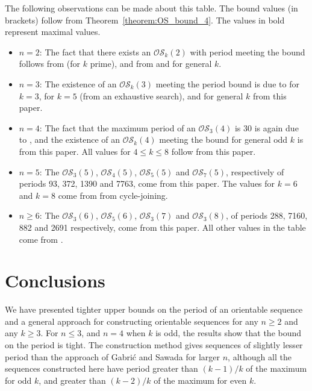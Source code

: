 \documentclass[a4paper,11pt]{article}
\begin{document}
The following observations can be made about this table.  The bound values (in brackets) follow
from Theorem~\ref{theorem:OS_bound_4}. The values in bold represent maximal values.
\begin{itemize}
\item $n=2$:  The fact that there exists an $\mathcal{OS}_k(2)$ with period meeting the bound
    follows from \cite[Theorem 5.4]{Alhakim24a} (for $k$ prime), and from \cite[Theorem
    2]{Gabric25} and \cite[Lemma 2.2]{Mitchell25a} for general $k$.
\item $n=3$: The existence of an $\mathcal{OS}_k(3)$ meeting the period bound is due to
    \cite[Example 5.1]{Alhakim24a} for $k=3$, \cite[Section 1]{Gabric25} for $k=5$ (from an
    exhaustive search), and for general $k$ from this paper.
\item $n=4$: The fact that the maximum period of an $\mathcal{OS}_3(4)$ is 30 is again due to
    \cite[Section 1]{Gabric25}, and the existence of an $\mathcal{OS}_k(4)$ meeting the bound
    for general odd $k$ is from this paper. All values for $4\leq k\leq 8$ follow from this
    paper.
\item $n=5$: The $\mathcal{OS}_3(5)$, $\mathcal{OS}_4(5)$, $\mathcal{OS}_5(5)$ and
    $\mathcal{OS}_7(5)$, respectively of periods 93, 372, 1390 and 7763, come from this paper.
    The values for $k=6$ and $k=8$ come from \cite[Theorem 11]{Gabric25} from cycle-joining.
\item $n\geq6$: The $\mathcal{OS}_3(6)$, $\mathcal{OS}_5(6)$, $\mathcal{OS}_3(7)$ and
    $\mathcal{OS}_3(8)$, of periods 288, 7160, 882 and 2691 respectively, come from this paper.
    All other values in the table come from \cite[Theorem 11]{Gabric25}.
\end{itemize}

\section{Conclusions}  \label{section:conclusions}

We have presented tighter upper bounds on the period of an orientable sequence and a general
approach for constructing orientable sequences for any $n\geq2$ and any $k\geq3$. For $n\leq3$, and
$n=4$ when $k$ is odd, the results show that the bound on the period is tight. The construction
method gives sequences of slightly lesser period than the approach of Gabri\'{c} and Sawada
\cite[Theorem 11]{Gabric25} for larger $n$, although all the sequences constructed here have period
greater than $(k-1)/k$ of the maximum for odd $k$, and greater than $(k-2)/k$ of the maximum for
even $k$.
\end{document}
